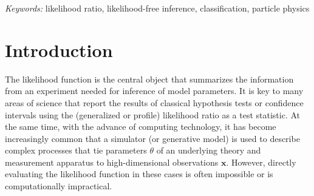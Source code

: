 \documentclass[12pt]{article}
\numberwithin{equation}{section}
\theoremstyle{plain}
\begin{document}
\noindent%
{\it Keywords:}  likelihood ratio, likelihood-free inference, classification, particle physics
\vfill

\newpage
{} %




\section{Introduction}
\label{sec:introduction}


The likelihood function is the central object that summarizes the information
from an experiment needed for inference of model parameters. It
is key to many areas of science that report the results of classical
hypothesis tests or confidence intervals using the (generalized or profile)
likelihood ratio as a test statistic. At the same time, with the advance of
computing technology, it has become increasingly common that a simulator (or
generative model) is used to describe complex processes that tie parameters
$\theta$ of an underlying theory and measurement apparatus to high-dimensional
observations $\mathbf{x}$. However, directly evaluating the likelihood function
in these cases is often impossible or is computationally impractical.
\end{document}
